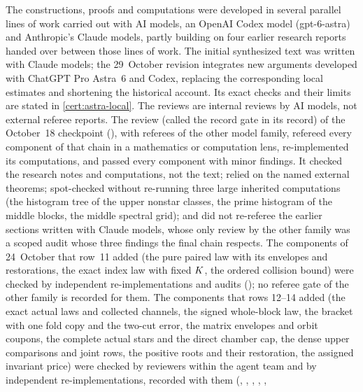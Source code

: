 The constructions, proofs and computations were developed in several
parallel lines of work carried out with AI models, an OpenAI Codex model
(gpt-6-astra) and Anthropic's Claude models, partly building on four
earlier research reports handed over between those lines of work. The
initial synthesized text was written with Claude models; the
29~October revision integrates new arguments developed with
ChatGPT Pro Astra~6 and Codex, replacing the corresponding local
estimates and
shortening the historical account. Its exact checks and their
limits are stated in \cref{cert:astra-local}. The reviews are internal reviews by AI models, not external
referee reports. The review (called the record gate in its record) of the October~18 checkpoint
(), with referees of the other model
family, refereed every component of that chain in a mathematics or computation
lens, re-implemented its computations, and passed every component with minor
findings. It checked the research notes and computations, not the text; relied
on the named external theorems; spot-checked without re-running three large
inherited computations (the histogram tree of the upper nonstar classes, the
prime histogram of the middle blocks, the middle spectral grid); and did not
re-referee the earlier sections written with Claude models, whose only review by
the other family was a scoped audit whose three findings the final chain
respects. The components of 24~October that row~11 added (the pure paired law
with its envelopes and restorations, the exact index law with fixed $K$, the
ordered collision bound) were checked by independent re-implementations and
audits (); no referee gate of the other family is
recorded for them. The components that rows 12--14 added (the exact actual laws
and collected channels, the signed whole-block law, the bracket with one fold
copy and the two-cut error, the matrix envelopes and orbit coupons, the complete
actual stars and the direct chamber cap, the dense upper comparisons and joint
rows, the positive roots and their restoration, the assigned invariant price)
were checked by reviewers within the agent team and by independent
re-implementations, recorded with them
(,
,
,
,
,
